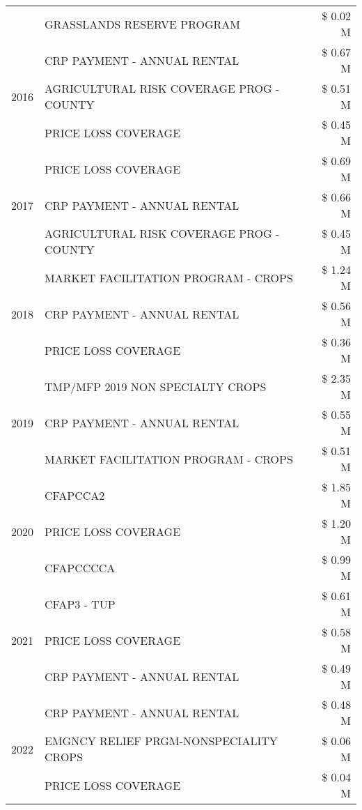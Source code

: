 \begin{tabular}{llr}
 & GRASSLANDS RESERVE PROGRAM & \$ 0.02 M \\
\cline{1-3}
\multirow[t]{3}{*}{2016} & CRP PAYMENT - ANNUAL RENTAL & \$ 0.67 M \\
 & AGRICULTURAL RISK COVERAGE PROG - COUNTY & \$ 0.51 M \\
 & PRICE LOSS COVERAGE & \$ 0.45 M \\
\cline{1-3}
\multirow[t]{3}{*}{2017} & PRICE LOSS COVERAGE & \$ 0.69 M \\
 & CRP PAYMENT - ANNUAL RENTAL & \$ 0.66 M \\
 & AGRICULTURAL RISK COVERAGE PROG - COUNTY & \$ 0.45 M \\
\cline{1-3}
\multirow[t]{3}{*}{2018} & MARKET FACILITATION PROGRAM - CROPS & \$ 1.24 M \\
 & CRP PAYMENT - ANNUAL RENTAL & \$ 0.56 M \\
 & PRICE LOSS COVERAGE & \$ 0.36 M \\
\cline{1-3}
\multirow[t]{3}{*}{2019} & TMP/MFP 2019 NON SPECIALTY CROPS & \$ 2.35 M \\
 & CRP PAYMENT - ANNUAL RENTAL & \$ 0.55 M \\
 & MARKET FACILITATION PROGRAM - CROPS & \$ 0.51 M \\
\cline{1-3}
\multirow[t]{3}{*}{2020} & CFAPCCA2 & \$ 1.85 M \\
 & PRICE LOSS COVERAGE & \$ 1.20 M \\
 & CFAPCCCCA & \$ 0.99 M \\
\cline{1-3}
\multirow[t]{3}{*}{2021} & CFAP3 - TUP & \$ 0.61 M \\
 & PRICE LOSS COVERAGE & \$ 0.58 M \\
 & CRP PAYMENT - ANNUAL RENTAL & \$ 0.49 M \\
\cline{1-3}
\multirow[t]{3}{*}{2022} & CRP PAYMENT - ANNUAL RENTAL & \$ 0.48 M \\
 & EMGNCY RELIEF PRGM-NONSPECIALITY CROPS & \$ 0.06 M \\
 & PRICE LOSS COVERAGE & \$ 0.04 M \\
\cline{1-3}
\bottomrule
\end{tabular}

